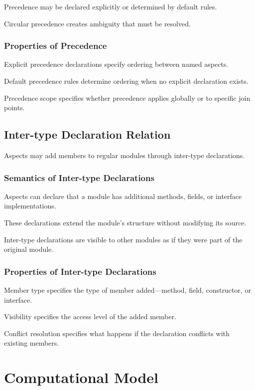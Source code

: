 \documentclass[11pt]{article}
\begin{document}
Precedence may be declared explicitly or determined by default rules.

Circular precedence creates ambiguity that must be resolved.

\subsubsection{Properties of Precedence}

Explicit precedence declarations specify ordering between named aspects.

Default precedence rules determine ordering when no explicit declaration exists.

Precedence scope specifies whether precedence applies globally or to specific join points.

\subsection{Inter-type Declaration Relation}

Aspects may add members to regular modules through inter-type declarations.

\subsubsection{Semantics of Inter-type Declarations}

Aspects can declare that a module has additional methods, fields, or interface implementations.

These declarations extend the module's structure without modifying its source.

Inter-type declarations are visible to other modules as if they were part of the original module.

\subsubsection{Properties of Inter-type Declarations}

Member type specifies the type of member added---method, field, constructor, or interface.

Visibility specifies the access level of the added member.

Conflict resolution specifies what happens if the declaration conflicts with existing members.

\section{Computational Model}
\end{document}
